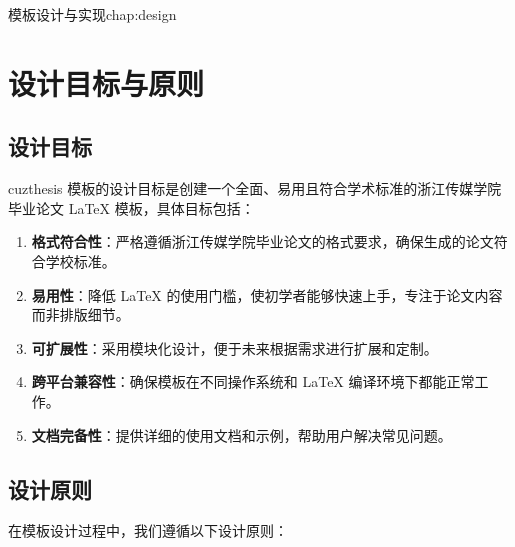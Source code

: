 \begin{cuzchapter}{模板设计与实现}{chap:design}


    \section{设计目标与原则}\label{sec:design-goals}

    \subsection{设计目标}

    cuzthesis 模板的设计目标是创建一个全面、易用且符合学术标准的浙江传媒学院毕业论文 LaTeX 模板，具体目标包括：

    \begin{enumerate}
        \item \textbf{格式符合性}：严格遵循浙江传媒学院毕业论文的格式要求，确保生成的论文符合学校标准。

        \item \textbf{易用性}：降低 LaTeX 的使用门槛，使初学者能够快速上手，专注于论文内容而非排版细节。

        \item \textbf{可扩展性}：采用模块化设计，便于未来根据需求进行扩展和定制。

        \item \textbf{跨平台兼容性}：确保模板在不同操作系统和 LaTeX 编译环境下都能正常工作。

        \item \textbf{文档完备性}：提供详细的使用文档和示例，帮助用户解决常见问题。
    \end{enumerate}

    \subsection{设计原则}

    在模板设计过程中，我们遵循以下设计原则：


\end{cuzchapter}
